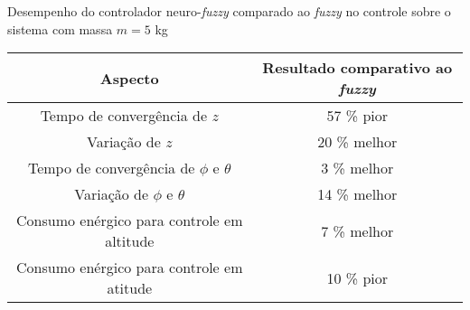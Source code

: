 \begin{quadro}[!htb]
    \centering
    \caption{Desempenho do controlador neuro-\textit{fuzzy} comparado ao \textit{fuzzy} no controle sobre o sistema com massa $m=5$ kg\label{qua:resultados_5kg_comparativo_fuzzy}}
    \begin{tabular}{|c|c|}
        \hline
        \textbf{Aspecto} & 
        \textbf{Resultado comparativo ao \textit{fuzzy}} \\
        \hline %
            Tempo de convergência de $z$ &
            57 \% pior \\
        \hline %
            Variação de $z$ &
            20 \% melhor \\
        \hline %
            Tempo de convergência de $\phi$ e $\theta$ &
            3 \% melhor \\
        \hline %
            Variação de $\phi$ e $\theta$ &
            14 \% melhor \\
        \hline %
            Consumo enérgico para controle em altitude &
            7 \% melhor \\
        \hline %
            Consumo enérgico para controle em atitude &
            10 \% pior \\
        \hline
    \end{tabular}
\end{quadro}